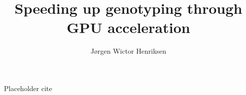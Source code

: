 \documentclass[12pt,letterpaper]{article}
\title{\textbf{Speeding up genotyping through GPU acceleration}}
\date{}
\author{Jørgen Wictor Henriksen}
\begin{document}
\maketitle
\newpage


\newpage

\tableofcontents
\newpage



Placeholder cite \cite{numpy}

\newpage
\printbibliography
\end{document}
